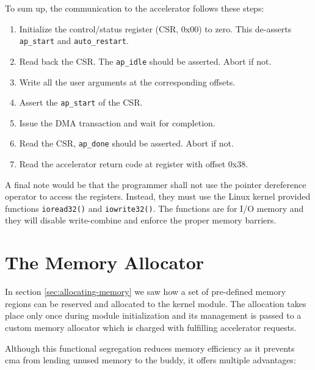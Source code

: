 To sum up, the communication to the accelerator follows these steps:

\begin{enumerate}
\item	Initialize the control/status register (CSR, 0x00) to zero. 
	This de-asserts \texttt{ap\_start} and \texttt{auto\_restart}.
\item	Read back the CSR. The \texttt{ap\_idle} should be asserted. Abort if not.
\item	Write all the user arguments at the corresponding offsets.
\item	Assert the \texttt{ap\_start} of the CSR.
\item	Issue the DMA transaction and wait for completion.
\item	Read the CSR, \texttt{ap\_done} should be asserted. Abort if not.
\item	Read the accelerator return code at register with offset 0x38.
\end{enumerate}

A final note would be that the programmer shall not use the pointer dereference operator
to access the registers. Instead, they must use the Linux kernel provided functions
\texttt{ioread32()} and \texttt{iowrite32()}. The functions are for I/O memory and
they will disable write-combine and enforce the proper memory barriers.

\section{The Memory Allocator}
\label{sec:memory-allocator}

In section \ref{sec:allocating-memory} we saw how a set of pre-defined memory regions can be
reserved and allocated to the kernel module. The allocation takes place only once
during module initialization and its management is passed to a custom memory allocator
which is charged with fulfilling accelerator requests.

Although this functional segregation reduces memory efficiency as it prevents \gls{cma} from 
lending unused memory to the \gls{buddy}, it offers multiple advantages:

